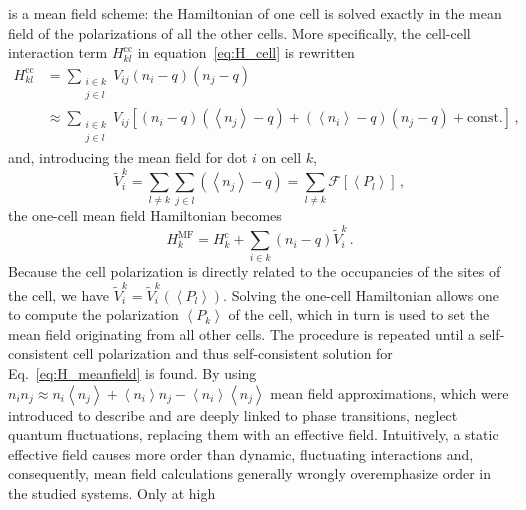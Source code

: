 %
 is a mean field scheme: the Hamiltonian of one cell is solved
exactly in the mean field of the polarizations of all the other cells. More
specifically, the cell-cell interaction term $H^\text{cc}_{kl}$ in
equation~\eqref{eq:H_cell} is rewritten
\begin{equation}
\begin{split}
  \label{eq:H_kl_meanfield}
  H^\text{cc}_{kl} 
  &=
  \sum_{\substack{i \in k\\j \in l}} V_{ij} \left( n_i - q \right) \left( n_j - q \right) \\
  &\approx
  \sum_{\substack{i \in k\\j \in l}} V_{ij} 
       \left[ \left( n_i - q \right) \left( \left< n_j \right> - q \right)
              +
              \left( \left< n_i \right> - q \right) \left( n_j - q \right)
              +
              \text{const.}
       \right] \, ,
\end{split}
\end{equation}
and, introducing the mean field for dot $i$ on cell $k$,
\begin{equation}
  \label{eq:V_meanfield}
  \tilde{V}_i^k
  = \sum_{l \ne k} \sum_{j \in l} \left( \left< n_j \right> - q \right)
  = \sum_{l \ne k} \mathcal{F} \left[ \left< P_l \right> \right] \, ,
\end{equation}
the one-cell mean field Hamiltonian becomes
\begin{equation}
  \label{eq:H_meanfield}
  H^{\mathrm{MF}}_k
  = H^\text{c}_k + \sum_{i \in k} \left( n_i - q \right) \tilde{V}_i^k \, .
\end{equation}
Because the cell polarization is directly related to the occupancies of the
sites of the cell, we have $\tilde{V}_i^k = \tilde{V}_i^k(\left<P_l\right>)$.
Solving the one-cell Hamiltonian allows one to compute the polarization $\left<
P_k \right>$ of the cell, which in turn is used to set the mean field
originating from all other cells. The procedure is repeated until a
self-consistent cell polarization and thus self-consistent solution for
Eq.~\eqref{eq:H_meanfield} is found. By using
$n_i n_j \approx n_i \left< n_j \right> + \left< n_i \right> n_j - 
\left< n_i \right> \left< n_j \right>$
mean field approximations, which were introduced to describe and are deeply
linked to phase transitions, neglect quantum fluctuations, replacing them with
an effective field. Intuitively, a static effective field causes more order than
dynamic, fluctuating interactions and, consequently, mean field calculations
generally wrongly overemphasize order in the studied systems.  Only at high
